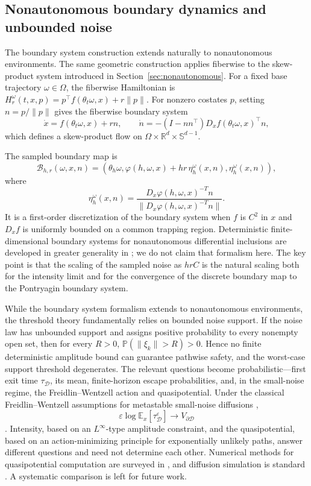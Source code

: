 \documentclass[pdflatex,sn-mathphys-num]{sn-jnl}
\numberwithin{equation}{section}
\theoremstyle{thmstyleone}%
\theoremstyle{definition}
\theoremstyle{remark}
\begin{document}
\subsection{Nonautonomous boundary dynamics and unbounded noise}
\label{subsec:nonautonomous-and-unbounded}

The boundary system construction extends naturally to nonautonomous environments. The same geometric construction applies fiberwise to the skew-product system introduced in Section~\ref{sec:nonautonomous}.
For a fixed base trajectory $\omega\in\Omega$, the fiberwise Hamiltonian is
$H_r^\omega(t,x,p)=p^\top f(\theta_t\omega,x)+r\|p\|$. For nonzero costates $p$, setting $n=p/\|p\|$ gives the fiberwise boundary system
\[
\dot x=f(\theta_t\omega,x)+rn,
\qquad
\dot n
=
-(I-nn^\top)D_xf(\theta_t\omega,x)^\top n,
\]
which defines a skew-product flow on $\Omega\times\mathbb R^d\times\mathbb S^{d-1}$.

The sampled boundary map is
\[
\mathcal B_{h,r}
(\omega,x,n)
=
\left(
\theta_h\omega,
\varphi(h,\omega,x)+hr\,\eta_h^\omega(x,n),
\eta_h^\omega(x,n)
\right),
\]
where
\[
\eta_h^\omega(x,n)
=
\frac{
D_x\varphi(h,\omega,x)^{-T}n
}{
\|D_x\varphi(h,\omega,x)^{-T}n\|
}.
\]
It is a first-order discretization of the boundary system when $f$ is $C^2$ in $x$ and $D_xf$ is uniformly bounded on a common trapping region. Deterministic finite-dimensional boundary systems for nonautonomous
differential inclusions are developed in greater generality in \citep{kourliouros2026invariant}; we do not claim that formalism here. The key point is that the scaling of the sampled noise as $hrC$ is the
natural scaling both for the intensity limit and for the convergence of the discrete boundary map to the Pontryagin boundary system.

While the boundary system formalism extends to nonautonomous environments, the threshold theory fundamentally relies on bounded noise support. If the noise law has unbounded support and assigns positive probability to every nonempty open set, then for every $R>0$, $\mathbb P(\|\xi_k\|>R)>0$. Hence no finite deterministic amplitude bound can guarantee pathwise safety, and the worst-case support threshold degenerates. The relevant questions become probabilistic---first exit time $\tau_{\mathcal D}$, its mean,
finite-horizon escape probabilities, and, in the small-noise regime, the Freidlin--Wentzell action and quasipotential. Under the classical Freidlin--Wentzell assumptions for metastable small-noise diffusions \citep{freidlinrandom,berglund2006noise},
\[
\varepsilon
\log\mathbb E_x[\tau_{\mathcal D}^{\varepsilon}]
\to
V_{\partial\mathcal D}
\]
.
Intensity, based on an $L^\infty$-type amplitude constraint, and the quasipotential, based on an action-minimizing principle for exponentially unlikely paths, answer different questions and need not determine each
other. Numerical methods for quasipotential computation are surveyed in \citep{grafke2019numerical,cameron2012finding}, and diffusion simulation is standard \citep{kloeden2012numerical}. A systematic comparison is left for future work.
\end{document}
